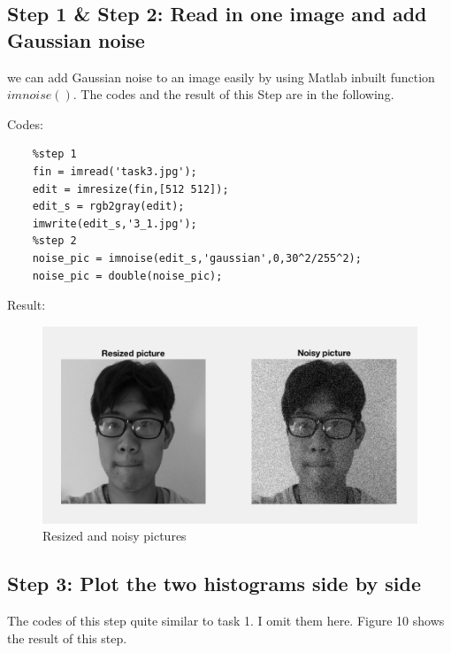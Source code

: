 \documentclass{article}
\begin{document}
\subsection*{Step 1 \& Step 2: Read in one image and add Gaussian noise}
we can add Gaussian noise to an image easily by using Matlab inbuilt function $imnoise()$. The codes and the result of this Step are in the following.

Codes:
\begin{lstlisting}
    %step 1
    fin = imread('task3.jpg');
    edit = imresize(fin,[512 512]);
    edit_s = rgb2gray(edit);
    imwrite(edit_s,'3_1.jpg');
    %step 2
    noise_pic = imnoise(edit_s,'gaussian',0,30^2/255^2);
    noise_pic = double(noise_pic);
\end{lstlisting}

Result:
\begin{figure}[htbp]
    \centering
    \includegraphics[scale = 0.6]{fig9.png}
    \caption{Resized and noisy pictures}
    \label{fig9}
\end{figure}

\subsection*{Step 3: Plot the two histograms side by side}

The codes of this step quite similar to task 1. I omit them here. Figure 10 shows the result of this step. 
\end{document}
